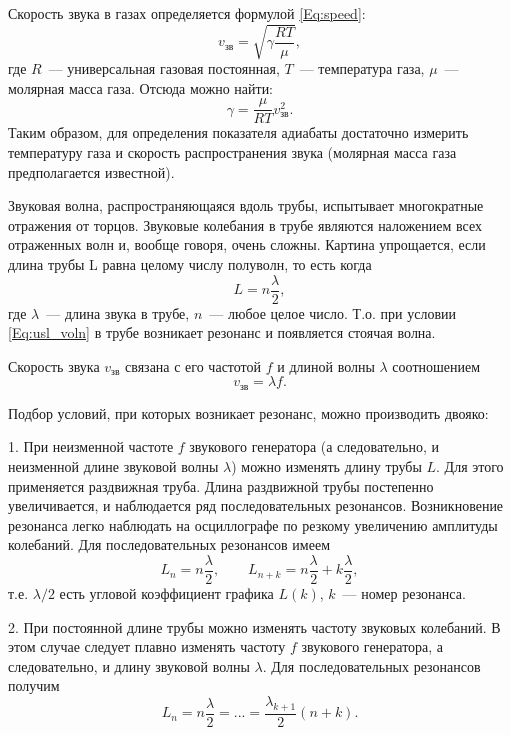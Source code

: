 \documentclass[a4paper,12pt]{article}
\begin{document}
Скорость звука в газах определяется формулой \eqref{Eq:speed}:
\begin{equation}
v_{\text{зв}} = \sqrt{\gamma \frac{RT}{\mu}},
\label{Eq:speed}
\end{equation}
где $R$~--- универсальная газовая постоянная, $T$~--- температура газа, $\mu$~--- молярная масса газа. Отсюда можно найти:
\begin{equation}
\gamma = \frac{\mu}{RT}v_{\text{зв}}^2.
\label{Eq:gamma}
\end{equation}
Таким образом, для определения показателя адиабаты достаточно измерить температуру газа и скорость распространения звука (молярная масса газа предполагается известной).

Звуковая волна, распространяющаяся вдоль трубы, испытывает многократные отражения от торцов. Звуковые колебания в трубе являются наложением всех отраженных волн и, вообще говоря, очень сложны. Картина упрощается, если длина трубы L равна целому числу полуволн, то есть когда
\begin{equation}
L= n\frac{\lambda}{2},
\label{Eq:usl_voln}
\end{equation}
где $\lambda$~--- длина звука в трубе, $n$~--- любое целое число.
Т.о. при условии \eqref{Eq:usl_voln} в трубе возникает резонанс и появляется стоячая волна.

Скорость звука $v_{\text{зв}}$ связана с его частотой $f$ и длиной волны $\lambda$ соотношением
\begin{equation}
v_{\text{зв}} = \lambda f.
\label{Eq:speed_and_freq}
\end{equation}

Подбор условий, при которых возникает резонанс, можно производить двояко:

1. При неизменной частоте $f$ звукового генератора (а следовательно, и неизменной длине звуковой волны $\lambda$) можно изменять длину
трубы $L$. Для этого применяется раздвижная труба. Длина раздвижной трубы постепенно увеличивается, и наблюдается ряд последовательных резонансов. Возникновение резонанса легко наблюдать на осциллографе по резкому увеличению амплитуды колебаний. Для последовательных резонансов имеем
\begin{equation}
L_n=n\frac{\lambda}{2},\qquad L_{n+k} = n\frac{\lambda}{2}+k\frac{\lambda}{2},
\label{Eq:resonans_1}
\end{equation}
т.е. $\lambda/2$ есть угловой коэффициент графика $L(k)$, $k$~--- номер резонанса.

2. При постоянной длине трубы можно изменять частоту звуковых колебаний. В этом случае следует плавно изменять частоту $f$ звукового генератора, а следовательно, и длину звуковой волны $\lambda$. Для последовательных резонансов получим
\begin{equation}
L_n=n\frac{\lambda}{2}=...=\frac{\lambda_{k+1}}{2}(n+k).
\label{Eq:resonans_2}
\end{equation}
\end{document}
